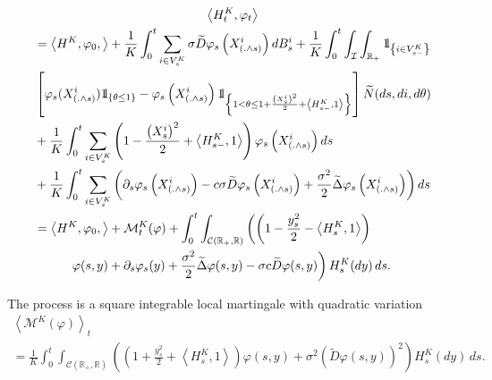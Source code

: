 \documentclass[10pt]{amsart}
\theoremstyle{definition}\newtheorem{defi}[theo]{Definition}\newtheorem{rema}[theo]{Remark}\newtheorem{exam}[theo]{Example}\newtheorem{exem}[theo]{Example}\newtheorem{nota}[theo]{Notation}
\newcommand{\Co}{\mathcal{C}}
\newcommand{\Io}{\mathcal{I}}
\newcommand{\Mo}{\mathcal{M}}
\newcommand*\R{\mathbb{R}}
\newcommand*\ind{{\mathchoice {\rm 1\mskip-4mu l} {\rm 1\mskip-4mu l} {\rm 1\mskip-4.5mu l} {\rm 1\mskip-5mu l}}}
\let\oldtilde\tilde
\renewcommand*{\tilde}[1]{\mathchoice{\widetilde{#1}}{\widetilde{#1}}{\oldtilde{#1}}{\oldtilde{#1}}}
\begin{document}
\begingroup
\allowdisplaybreaks
\begin{multline}\label{eq:sde2}
\left\langle H^{K}_t,\varphi_t\right\rangle
\\
\begin{aligned}
& = \left\langle H^{K}, \varphi_0,\right\rangle+ \frac{1}{K} \int_0^t \sum_{i \in  V^K_{s}} \sigma {\widetilde{D}} \varphi_s\left(X^i_{(.\wedge s)}\right) dB^i_s
  +\frac{1}{K}\int_0^t \int_{\Io}\int_{\R_+}\ind_{\left\{i \in V^K_{s-}\right\}}\\
& \left[\varphi_{s}(X^i_{\left(.\wedge s\right)})\ind_{\left\{\theta \leq 1\right\}} -\varphi_{s}\left(X^i_{\left(.\wedge s\right)}\right) \ind_{\left\{1 < \theta \leq 1+\frac{\left(X^i_s\right)^2}{2}+\left\langle H_{s-}^{K}, 1\right\rangle\right\}} \right] \tilde N(ds, di, d\theta) \\*
&+\frac{1}{K}\int_0^t \sum_{i \in V^K_{s}} \left(1 - \frac{\left(X^i_s\right)^2}{2}+\left\langle H_{s-}^{K},1\right\rangle \right) \varphi_{s}\left(X^i_{\left(.\wedge s\right)}\right) ds\\
&+\frac{1}{K} \int_0^t \sum_{i \in V^K_s}\left(\partial_s \varphi_s\left(X^i_{\left(.\wedge s\right)}\right) -c\sigma {\widetilde{D}}\varphi_s\left(X^i_{\left(.\wedge s\right)}\right)+\frac{\sigma^2}{2} {\widetilde{\Delta}}\varphi_s\left(X^i_{\left(.\wedge s\right)}\right) \right) ds\\
&= \left\langle H^{K}, \varphi_0,\right\rangle+ \Mo^K_t(\varphi)+
\int_0^t \int_{\Co\left(\R_+, \R\right)} \left(\left(1- \frac{y_s^2}{2} - \left\langle H^K_s,1\right\rangle\right)\right.
\\
& \mkern50mu\left.
\varphi(s,y) + \partial_s \varphi_s(y) +
\frac{\sigma^2}{2} \widetilde{\Delta}\varphi(s,y)-\sigma c \widetilde{D}\varphi(s,y) \right)H^K_s(dy)\, ds.
\end{aligned}
\end{multline}
\endgroup

The process is a square integrable local martingale with quadratic variation
\begin{multline}\label{eq:mart}
\left\langle \Mo^K(\varphi) \right\rangle_{t} \\= \frac{1}{K} \int_0^t \int_{\Co\left(\R_+,\R\right)} \left(\left(1+ \frac{y_s^2}{2} + \left\langle H^K_s,1\right\rangle\right)\varphi(s,y) + \sigma^2 \left({\widetilde{D}}\varphi(s,y)\right)^2
\right)H^K_s(dy)\, ds.
\end{multline}
\end{document}
